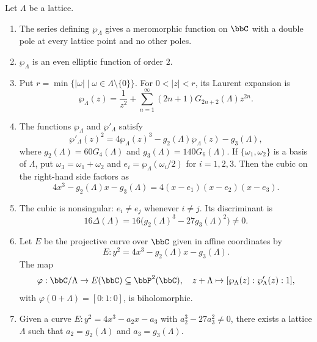 \begin{proposition}\label{Prop:MF_Weierstrass_properties}
    Let $\Lambda$ be a lattice.
    \begin{enumerate}[label=(\arabic*)]
        \item The series defining $\wp_\Lambda$ gives a meromorphic function on $\bbC$ with a double pole at every lattice point and no other poles.
        \item $\wp_\Lambda$ is an even elliptic function of order $2$.
        \item Put $r = \min\{|\omega| \mid \omega \in \Lambda \setminus \{0\}\}$. For $0 < |z| < r$, its Laurent expansion is
        \[
            \wp_\Lambda(z) = \frac{1}{z^2} + \sum_{n = 1}^{\infty}(2n + 1)G_{2n + 2}(\Lambda)z^{2n}.
        \]
        \item The functions $\wp_\Lambda$ and $\wp'_\Lambda$ satisfy
        \begin{equation}\label{eq:MF_Weierstrass_equation}
            \wp'_\Lambda(z)^2 = 4\wp_\Lambda(z)^3 - g_2(\Lambda)\wp_\Lambda(z) - g_3(\Lambda),
        \end{equation}
        where $g_2(\Lambda) = 60G_4(\Lambda)$ and $g_3(\Lambda) = 140G_6(\Lambda)$. If $\{\omega_1, \omega_2\}$ is a basis of $\Lambda$, put $\omega_3 = \omega_1 + \omega_2$ and $e_i = \wp_\Lambda(\omega_i/2)$ for $i = 1, 2, 3$. Then the cubic on the right-hand side factors as
        \[
            4x^3 - g_2(\Lambda)x - g_3(\Lambda) = 4(x - e_1)(x - e_2)(x - e_3).
        \]
        \item The cubic is nonsingular: $e_i \neq e_j$ whenever $i \neq j$. Its discriminant is
        \[
            16\Delta(\Lambda) = 16\bigl(g_2(\Lambda)^3 - 27g_3(\Lambda)^2\bigr) \neq 0.
        \]
        \item Let $E$ be the projective curve over $\bbC$ given in affine coordinates by
        \[
            E : y^2 = 4x^3 - g_2(\Lambda)x - g_3(\Lambda).
        \]
        The map
        \[
            \varphi : \bbC/\Lambda \to E(\bbC) \subseteq \bbP^2(\bbC), \quad z + \Lambda \mapsto [\wp_\Lambda(z) : \wp'_\Lambda(z) : 1],
        \]
        with $\varphi(0 + \Lambda) = [0 : 1 : 0]$, is biholomorphic.
        \item Given a curve $E : y^2 = 4x^3 - a_2x - a_3$ with $a_2^3 - 27a_3^2 \neq 0$, there exists a lattice $\Lambda$ such that $a_2 = g_2(\Lambda)$ and $a_3 = g_3(\Lambda)$.
    \end{enumerate}
\end{proposition}

